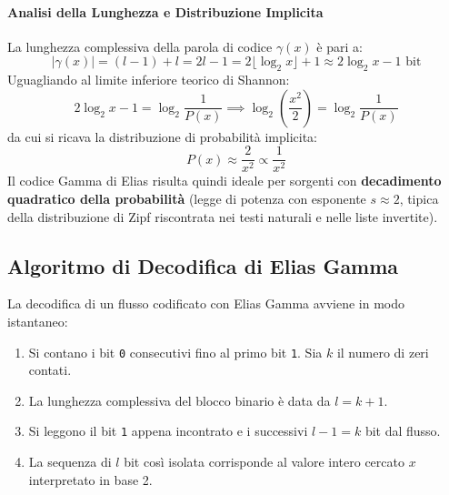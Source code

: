 \paragraph{Analisi della Lunghezza e Distribuzione Implicita}
La lunghezza complessiva della parola di codice $\gamma(x)$ \`e pari a:
\begin{equation}
  |\gamma(x)| = (l - 1) + l = 2l - 1 = 2\lfloor \log_2 x \rfloor + 1 \approx 2\log_2 x - 1 \text{ bit}
\end{equation}
Uguagliando al limite inferiore teorico di Shannon:
\begin{equation}
  2\log_2 x - 1 = \log_2 \frac{1}{P(x)} \implies \log_2\left( \frac{x^2}{2} \right) = \log_2 \frac{1}{P(x)}
\end{equation}
da cui si ricava la distribuzione di probabilit\`a implicita:
\begin{equation}
  P(x) \approx \frac{2}{x^2} \propto \frac{1}{x^2}
\end{equation}
Il codice Gamma di Elias risulta quindi ideale per sorgenti con \textbf{decadimento quadratico della probabilit\`a} (legge di potenza con esponente $s \approx 2$, tipica della distribuzione di Zipf riscontrata nei testi naturali e nelle liste invertite).

\FloatBarrier
\subsection{Algoritmo di Decodifica di Elias Gamma}
\label{subsec:decodifica-gamma}

La decodifica di un flusso codificato con Elias Gamma avviene in modo istantaneo:
\begin{enumerate}
  \item Si contano i bit \texttt{0} consecutivi fino al primo bit \texttt{1}. Sia $k$ il numero di zeri contati.
  \item La lunghezza complessiva del blocco binario \`e data da $l = k + 1$.
  \item Si leggono il bit \texttt{1} appena incontrato e i successivi $l - 1 = k$ bit dal flusso.
  \item La sequenza di $l$ bit cos\`i isolata corrisponde al valore intero cercato $x$ interpretato in base 2.
\end{enumerate}

